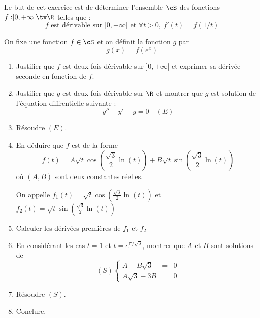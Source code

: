 


\begin{exercice}
Le but de cet exercice est de déterminer l'ensemble $\cS$ des fonctions
$f :]0,+\infty[\tv \R$ telles que : 
$$ \text{$f$ est dérivable sur $]0,+\infty[$ et } \forall t>0, \, f'(t) = f(1/t)$$

On fixe une fonction $f\in \cS$ et on définit la fonction $g$ par 
$$g(x) =f(e^{x})$$
\begin{enumerate}
\item Justifier que $f$ est deux fois dérivable sur $]0,+\infty[$ et exprimer sa dérivée seconde en fonction de $f$. 
\item Justifier que $g$ est deux fois dérivable sur $\R$ et montrer que $g$ est solution de l'équation diffrentielle suivante : 
$$y''-y'+y=0\quad(E)$$
\item Résoudre $(E)$. 
\item En déduire que $f$ est de la forme $$f(t) = A \sqrt{t}  \cos\left(\frac{\sqrt{3}}{2}\ln(t)\right) +B\sqrt{t}  \sin\left(\frac{\sqrt{3}}{2}\ln(t)\right)$$ où $(A,B)$ sont deux constantes réelles.

On appelle $f_1(t) =  \sqrt{t}  \cos\left(\frac{\sqrt{3}}{2}\ln(t)\right)$ et 
$f_2(t)= \sqrt{t}  \sin\left(\frac{\sqrt{3}}{2}\ln(t)\right)$
\item Calculer les dérivées premières de $f_1$ et $f_2$
\item En considérant les cas $t=1$ et $t=e^{\pi/\sqrt{3}}$, montrer que $A$ et $B$ sont solutions de
$$(S) \left\{ \begin{array}{ccc}
A-B\sqrt{3}&=&0\\
A\sqrt{3}-3B&=&0
\end{array}\right.$$
\item Résoudre $(S)$. 
\item Conclure. 
\end{enumerate} 
\end{exercice}

